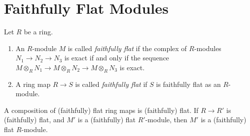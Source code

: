 %

\chapter{Faithfully Flat Modules}

\begin{definition}\cite[\href{https://stacks.math.columbia.edu/tag/00HB}{Definition 00HB}]{stacks-project}
	\label{definition-flat}
	Let $R$ be a ring.
	\begin{enumerate}
		
		\item An $R$-module $M$ is called {\it faithfully flat} if the
		complex of $R$-modules
		$N_1 \to N_2 \to N_3$ is exact if and only if
		the sequence $M \otimes_R N_1 \to M \otimes_R N_2 \to M \otimes_R N_3$
		is exact.
		
		\item A ring map $R \to S$ is called {\it faithfully flat} if
		$S$ is faithfully flat as an $R$-module.
	\end{enumerate}
\end{definition}

\begin{lemma}
	\label{lemma-composition-flat}
	A composition of (faithfully) flat ring maps is
	(faithfully) flat.
	If $R \to R'$ is (faithfully) flat, and $M'$ is a
	(faithfully) flat $R'$-module, then $M'$ is a
	(faithfully) flat $R$-module.
\end{lemma}

